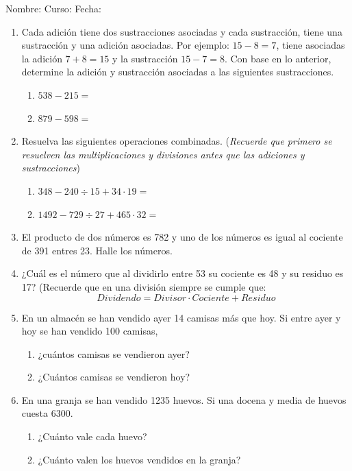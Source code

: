 \documentclass[letterpaper,fleqn]{article}
\newcommand{\LineaNombre}{%
\par
\vspace{\baselineskip}
Nombre:\hrulefill \; Curso: \underline{\hspace*{48pt}} \; Fecha: \underline{\hspace*{2.5cm}} \relax
\par}
\begin{document}
\LineaNombre
\begin{enumerate}
 \item Cada adición tiene dos sustracciones asociadas y cada sustracción, tiene una sustracción y una adición asociadas. Por ejemplo:
 $15-8=7$, tiene asociadas la adición $7+8=15$ y la sustracción $15-7=8$. Con base en lo anterior, determine la adición y sustracción asociadas a las siguientes sustracciones.
 \begin{enumerate}
 \item $538-215=$\noanswer
 \item $879-598=$\noanswer
 \end{enumerate}
 \item Resuelva las siguientes operaciones combinadas. (\textit{Recuerde que primero se resuelven las multiplicaciones y divisiones antes que las adiciones y sustracciones})
 \begin{enumerate}
 \item $348-240\div 15+34\cdot 19=$\noanswer
 \item $1492-729\div 27+465\cdot 32=$\noanswer
 \end{enumerate}
 \item El producto de dos números es 782 y uno de los números es igual al cociente de 391 entres 23. Halle los números.\noanswer
 \item ¿Cuál es el número que al dividirlo entre 53 su cociente es 48 y su residuo es 17? (Recuerde que en una división siempre se cumple que:
 \[Dividendo=Divisor\cdot Cociente+Residuo\]\noanswer
 \item En un almacén se han vendido ayer 14 camisas más que hoy. Si entre ayer y hoy se han vendido 100 camisas, 
\begin{enumerate}
\item ¿cuántos camisas se vendieron ayer?\noanswer
\item ¿Cuántos camisas se vendieron hoy?\noanswer
\end{enumerate} 
\newpage
 \item En una granja se han vendido 1235 huevos. Si una docena y media de huevos cuesta 6300.
 \begin{enumerate}
 \item ¿Cuánto vale cada huevo?\noanswer
 \item ¿Cuánto valen los huevos vendidos en la granja?\noanswer

\end{enumerate}
\end{enumerate}
\end{document}
